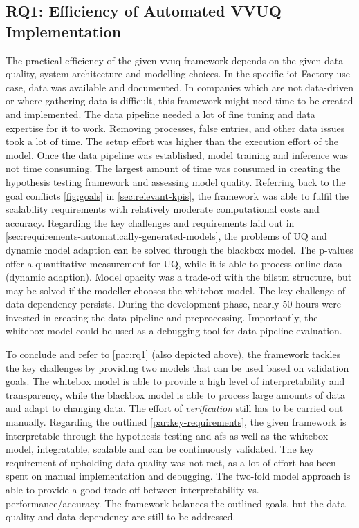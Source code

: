 \subsection{RQ1: Efficiency of Automated VVUQ Implementation}
\label{sec:discussion_rq1}
The practical efficiency of the given \gls{vvuq} framework depends on the given data quality, system architecture and modelling choices. In the specific \gls{iot} Factory use case, data was available and documented. In companies which are not data-driven or where gathering data is difficult, this framework might need time to be created and implemented. The data pipeline needed a lot of fine tuning and data expertise for it to work. Removing processes, false entries, and other data issues took a lot of time. The setup effort was higher than the execution effort of the model. Once the data pipeline was established, model training and inference was not time consuming. The largest amount of time was consumed in creating the hypothesis testing framework and assessing model quality. Referring back to the goal conflicts \autoref{fig:goals} in \autoref{sec:relevant-kpis}, the framework was able to fulfil the scalability requirements with relatively moderate computational costs and accuracy. Regarding the key challenges and requirements laid out in \autoref{sec:requirements-automatically-generated-models}, the problems of UQ and dynamic model adaption can be solved through the blackbox model. The p-values offer a quantitative measurement for UQ, while it is able to process online data (dynamic adaption). Model opacity was a trade-off with the \gls{bilstm} structure, but may be solved if the modeller chooses the whitebox model. The key challenge of data dependency persists. During the development phase, nearly 50 hours were invested in creating the data pipeline and preprocessing. Importantly, the whitebox model could be used as a debugging tool for data pipeline evaluation.

To conclude and refer to \autoref{par:rq1} (also depicted above), the framework tackles the key challenges by providing two models that can be used based on validation goals. The whitebox model is able to provide a high level of interpretability and transparency, while the blackbox model is able to process large amounts of data and adapt to changing data. The effort of \textit{verification} still has to be carried out manually. Regarding the outlined \autoref{par:key-requirements}, the given framework is interpretable through the hypothesis testing and \gls{afs} as well as the whitebox model, integratable, scalable and can be continuously validated. The key requirement of upholding data quality was not met, as a lot of effort has been spent on manual implementation and debugging. The two-fold model approach is able to provide a good trade-off between interpretability vs. performance/accuracy. The framework balances the outlined goals, but the data quality and data dependency are still to be addressed.

